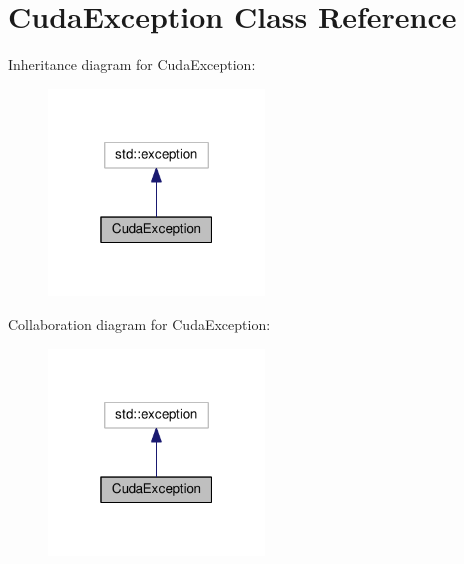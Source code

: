 \hypertarget{class_cuda_exception}{}\section{Cuda\+Exception Class Reference}
\label{class_cuda_exception}


Inheritance diagram for Cuda\+Exception\+:
\nopagebreak
\begin{figure}[H]
\begin{center}
\leavevmode
\includegraphics[width=163pt]{class_cuda_exception__inherit__graph}
\end{center}
\end{figure}


Collaboration diagram for Cuda\+Exception\+:
\nopagebreak
\begin{figure}[H]
\begin{center}
\leavevmode
\includegraphics[width=163pt]{class_cuda_exception__coll__graph}
\end{center}
\end{figure}
